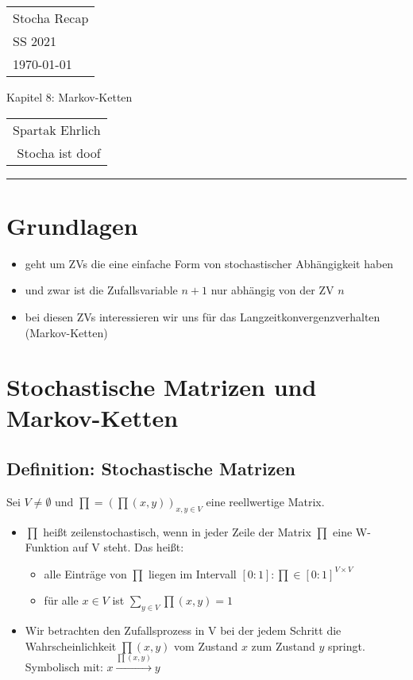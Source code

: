 \documentclass[a4paper,11pt]{scrartcl}
\begin{document}
{\raggedright
\begin{tabular}{l}
    Stocha Recap \\
    SS 2021 \\
    \today{}
\end{tabular}}
\hfill
{\Large Kapitel 8: Markov-Ketten}
\hfill
\begin{tabular}{r}
    Spartak Ehrlich \\
    Stocha ist doof
\end{tabular}
\hrule

\section{Grundlagen}
\begin{itemize}
    \item geht um ZVs die eine einfache Form von stochastischer Abhängigkeit haben
    \item und zwar ist die Zufallsvariable $n+1$ nur abhängig von der ZV $n$
    \item bei diesen ZVs interessieren wir uns für das Langzeitkonvergenzverhalten (Markov-Ketten)
\end{itemize}

\section{Stochastische Matrizen und Markov-Ketten}
\subsection{Definition: Stochastische Matrizen}
Sei $ V \neq \emptyset$ und $ \prod = (\prod (x,y))_{x,y \in V}$ eine reellwertige Matrix.

\begin{itemize}
    \item $\prod$ heißt zeilenstochastisch, wenn in jeder Zeile der Matrix $\prod$ eine W-Funktion auf V steht. Das heißt:
    \begin{itemize}
        \item alle Einträge von $\prod$ liegen im Intervall $[0:1]: \prod \in [0:1]^{V \times V}$
        \item für alle $x \in V$ ist $\sum_{y \in V} \prod (x,y) = 1$
    \end{itemize}
\item Wir betrachten den Zufallsprozess in V bei der jedem Schritt die Wahrscheinlichkeit $\prod (x,y)$ vom Zustand $x$ zum Zustand $y$ springt. Symbolisch mit: $x \stackrel{\prod (x,y)}{\rightarrow} y$
\end{itemize}
\end{document}
